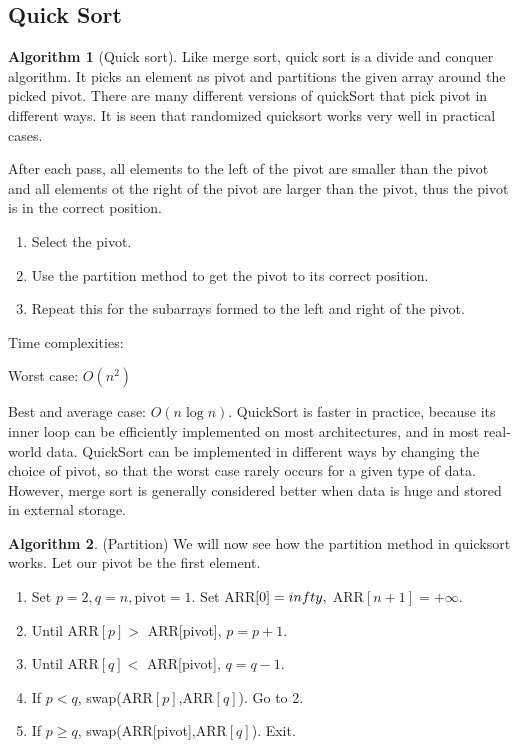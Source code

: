 \documentclass[10pt, a4paper]{extarticle}
\theoremstyle{definition}
\newtheorem{alg}{Algorithm}
\begin{document}
	\subsection{Quick Sort}
	\begin{alg}[Quick sort]
		Like merge sort, quick sort is a divide and conquer algorithm. It picks an element as pivot and partitions the given array around the picked pivot. There are many different versions of quickSort that pick pivot in different ways. It is seen that randomized quicksort works very well in practical cases. 

		After each pass, all elements to the left of the pivot are smaller than the pivot and all elements ot the right of the pivot are larger than the pivot, thus the pivot is in the correct position.
		\begin{enumerate}
			\item Select the pivot.
			\item Use the partition method to get the pivot to its correct position.
			\item Repeat this for the subarrays formed to the left and right of the pivot.
	\end{enumerate}
	Time complexities:

	Worst case: $O(n^2)$

	Best and average case: $O(n\log n)$. QuickSort is faster in practice, because its inner loop can be efficiently implemented on most architectures, and in most real-world data. QuickSort can be implemented in different ways by changing the choice of pivot, so that the worst case rarely occurs for a given type of data. However, merge sort is generally considered better when data is huge and stored in external storage. 
	\end{alg}

	\begin{alg}(Partition)
		We will now see how the partition method in quicksort works. Let our pivot be the first element. 
		\begin{enumerate}
			\item Set $p=2,q=n, \text{pivot}=1$. Set ARR$[0]=\-infty,$ ARR$[n+1]=+\infty$.
			\item Until ARR$[p]>$ ARR[pivot], $p=p+1$.
			\item Until ARR$[q]<$ ARR[pivot], $q=q-1$.
			\item If $p<q$, swap(ARR$[p]$,ARR$[q]$). Go to 2.
			\item If $p\geq q$, swap(ARR[pivot],ARR$[q]$). Exit.
	\end{enumerate}
	\end{alg}
	
\end{document}
